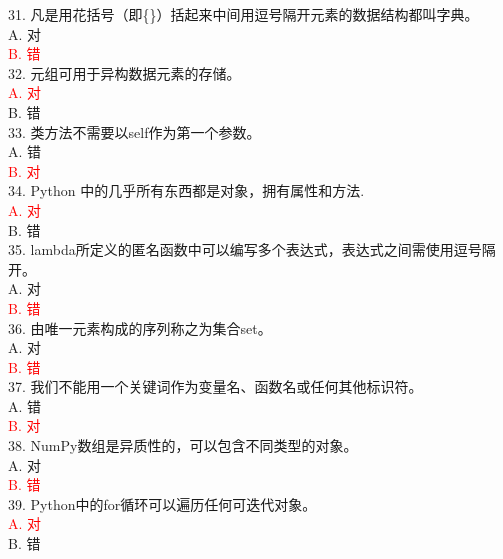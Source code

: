 \documentclass[6pt]{article}
\begin{document}
31. 凡是用花括号（即\{\}）括起来中间用逗号隔开元素的数据结构都叫字典。\\

A. 对\\
\textcolor{red}{B. 错}\\

32. 元组可用于异构数据元素的存储。\\

\textcolor{red}{A. 对}\\
B. 错\\


33. 类方法不需要以self作为第一个参数。\\

A. 错\\
\textcolor{red}{B. 对}\\


34. Python 中的几乎所有东西都是对象，拥有属性和方法.\\

\textcolor{red}{A. 对}\\
B. 错\\

35. lambda所定义的匿名函数中可以编写多个表达式，表达式之间需使用逗号隔开。\\

A. 对\\
\textcolor{red}{B. 错}\\

36. 由唯一元素构成的序列称之为集合set。\\

A. 对\\
\textcolor{red}{B. 错}\\

37. 我们不能用一个关键词作为变量名、函数名或任何其他标识符。\\

A. 错\\
\textcolor{red}{B. 对}\\


38. NumPy数组是异质性的，可以包含不同类型的对象。\\

A. 对\\
\textcolor{red}{B. 错}\\

39. Python中的for循环可以遍历任何可迭代对象。\\

\textcolor{red}{A. 对}\\
B. 错\\
\end{document}
